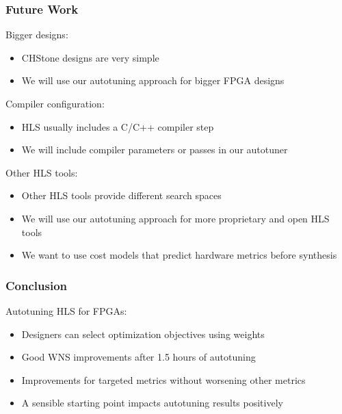 \documentclass[10pt, compress, xcolor={table,xcdraw,usenames}, aspectratio=169]{beamer}
\begin{document}
\begin{frame}
    \frametitle{Future Work}
    \begin{block}{\alert{Bigger designs}:}
        \begin{itemize}
            \item CHStone \alert{designs are very simple}
            \item We will use our autotuning approach for \alert{bigger FPGA
                designs}
        \end{itemize}
    \end{block}

    \begin{block}{\alert{Compiler configuration}:}
        \begin{itemize}
            \item HLS usually includes a C/C++ \alert{compiler step}
            \item We will include \alert{compiler parameters or passes} in our
                autotuner
        \end{itemize}
    \end{block}

    \begin{block}{\alert{Other HLS tools}:}
        \begin{itemize}
            \item Other HLS tools provide \alert{different search spaces}
            \item We will use our autotuning approach for more
                \alert{proprietary and open HLS tools}
            \item We want to use cost models that \alert{predict hardware
                metrics before synthesis}
        \end{itemize}
    \end{block}
\end{frame}

\begin{frame}
    \frametitle{Conclusion}
    \begin{block}{Autotuning HLS for FPGAs:}
        \begin{itemize}
            \item Designers can \alert{select optimization objectives using
                weights}
            \item Good \alert{WNS improvements} after \alert{1.5 hours} of
                autotuning
            \item Improvements for targeted metrics \alert{without worsening
                other metrics}
            \item A \alert{sensible starting point} impacts autotuning results
                positively
        \end{itemize}
    \end{block}
\end{frame}

\maketitle
\end{document}
